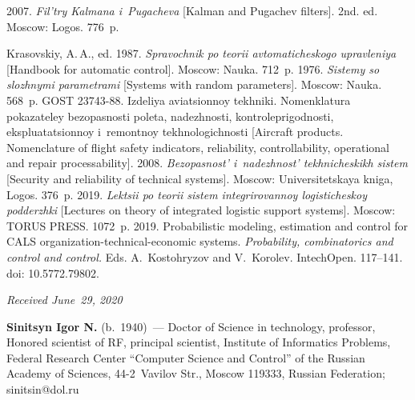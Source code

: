 \begin{multicols}{2}
{{\begin{thebibliography}{99}
 2007. \textit{Fil'try Kalmana i~Pugacheva} [Kalman and Pugachev filters]. 
2nd. ed. Moscow: Logos. 776~p.

Krasovskiy, A.\,A., ed. 1987. 
\textit{Spravochnik po teorii avtomaticheskogo upravleniya} [Handbook for automatic control]. Moscow: Nauka. 
712~p.
 1976.
\textit{Sistemy so slozhnymi parametrami} [Systems with random parameters]. Moscow: Nauka. 568~p.
GOST 23743-88. Izdeliya aviatsionnoy tekhniki. Nomenklatura pokazateley bezopasnosti poleta, 
na\-dezh\-nosti, kontroleprigodnosti, ekspluatatsionnoy i~remontnoy tekhnologichnosti 
[Aircraft products. Nomenclature of flight safety indicators, reliability, controllability, 
operational and repair processability].
 2008. \textit{Bezopasnost' i~nadezhnost' tekhnicheskikh sistem} [Security and reliability of technical systems]. 
 Moscow: Universitetskaya kniga, Logos. 376~p.
 2019. \textit{Lektsii po teorii sistem integrirovannoy logisticheskoy podderzhki}
 [Lectures on theory of integrated logistic support systems]. Moscow: TORUS PRESS. 1072~p.
 2019. 
Probabilistic modeling, estimation and control for CALS organization-technical-economic systems. 
\textit{Probability, combinatorics and control and control.} 
Eds. A.~Kostohryzov and V.~Korolev. IntechOpen. 117--141.  doi: 10.5772.79802.
 \end{thebibliography}

 }
 }

\end{multicols}

\vspace*{-3pt}

  \hfill{\small\textit{Received June~29, 2020}}




\Contrl

\noindent
\textbf{Sinitsyn Igor N.} (b.\ 1940)~--- 
Doctor of Science in technology, professor, Honored scientist of RF, principal scientist, 
Institute of Informatics Problems, Federal Research Center 
``Computer Science and Control'' of the Russian Academy of Sciences, 
44-2~Vavilov Str., Moscow 119333, Russian Federation; \mbox{sinitsin@dol.ru}

\label{end\stat}

\renewcommand{\bibname}{\protect\rm Литература}